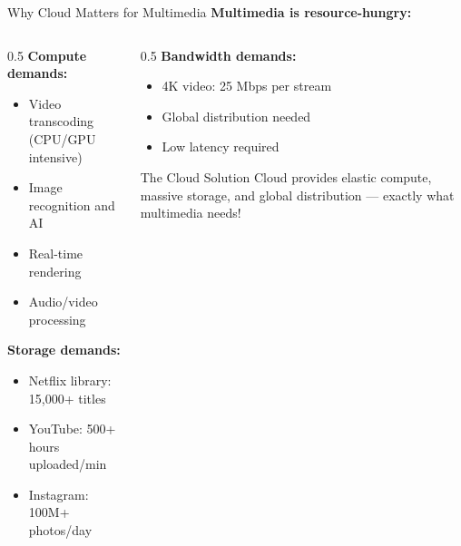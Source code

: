 \documentclass[aspectratio=169,12pt]{beamer}
\begin{document}
\begin{frame}{Why Cloud Matters for Multimedia}
    \textbf{Multimedia is resource-hungry:}
    
    \begin{columns}
        \begin{column}{0.5\textwidth}
            \textbf{Compute demands:}
            \begin{itemize}
                \item Video transcoding (CPU/GPU intensive)
                \item Image recognition and AI
                \item Real-time rendering
                \item Audio/video processing
            \end{itemize}
            
            \vspace{0.3cm}
            \textbf{Storage demands:}
            \begin{itemize}
                \item Netflix library: 15,000+ titles
                \item YouTube: 500+ hours uploaded/min
                \item Instagram: 100M+ photos/day
            \end{itemize}
        \end{column}
        \begin{column}{0.5\textwidth}
            \textbf{Bandwidth demands:}
            \begin{itemize}
                \item 4K video: 25 Mbps per stream
                \item Global distribution needed
                \item Low latency required
            \end{itemize}
            
            \vspace{0.3cm}
            \begin{alertblock}{The Cloud Solution}
                Cloud provides elastic compute, massive storage, and global distribution --- exactly what multimedia needs!
            \end{alertblock}
        \end{column}
    \end{columns}
\end{frame}
\end{document}
